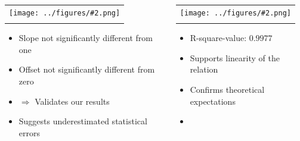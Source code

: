 \documentclass[10pt]{beamer}
\newcommand{\gra}[3][]{
	\begin{table}
	\centering
	\begin{tabular}[width=\textwidth]{c}
		\texttt{[image: ../figures/\#2.png]}\\
		\small #3
	\end{tabular}
	\end{table}
}
\begin{document}
\begin{frame}
	\begin{columns}
	\begin{column}{0.5\textwidth}
		\gra{LinFitResFreq}{}
	\begin{itemize}
		\item Slope not significantly different from one
		\item Offset not significantly different from zero
		\item[]$\Rightarrow$ Validates our results
		\item Suggests underestimated statistical errors
	\end{itemize}
	\end{column}
	\begin{column}{0.5\textwidth}
		\gra{LinFitResFreq1}{}
	\begin{itemize}
		\item R-square-value: $0.9977$
		\item Supports linearity of the relation
		\item Confirms theoretical expectations
		\item[] \ 
	\end{itemize}
	\end{column}
	\end{columns}
\end{frame}
\end{document}
